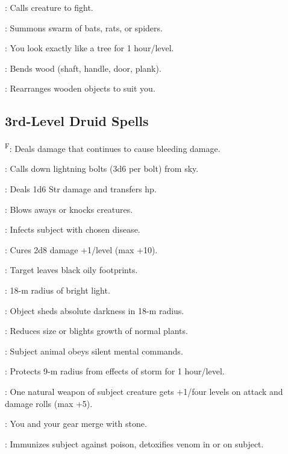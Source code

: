 : Calls creature to fight.

: Summons swarm of bats, rats, or spiders.

: You look exactly like a tree for 1 hour/level.

: Bends wood (shaft, handle, door, plank).

: Rearranges wooden objects to suit you.



\subsection{3rd-Level Druid Spells}

\textsuperscript{F}: Deals damage that continues to cause bleeding damage.%

: Calls down lightning bolts (3d6 per bolt) from sky.

: Deals 1d6 Str damage and transfers hp.

: Blows aways or knocks creatures.

: Infects subject with chosen disease.

: Cures 2d8 damage +1/level (max +10).

: Target leaves black oily footprints.%

: 18-m radius of bright light.

: Object sheds absolute darkness in 18-m radius.

: Reduces size or blights growth of normal plants.

: Subject animal obeys silent mental commands.

: Protects 9-m radius from effects of storm for 1 hour/level.%

: One natural weapon of subject creature gets +1/four levels on attack and damage rolls (max +5).

: You and your gear merge with stone.

: Immunizes subject against poison, detoxifies venom in or on subject.


